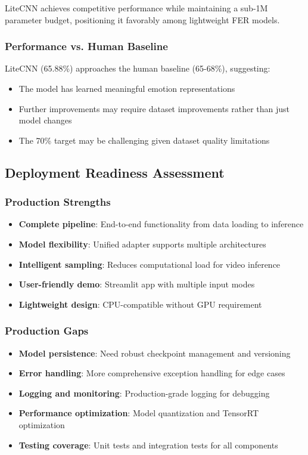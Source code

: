 \documentclass[12pt,a4paper]{article}
\begin{document}
LiteCNN achieves competitive performance while maintaining a sub-1M parameter budget, positioning it favorably among lightweight FER models.

\subsubsection{Performance vs. Human Baseline}
LiteCNN (65.88\%) approaches the human baseline (65-68\%), suggesting:
\begin{itemize}[leftmargin=*]
    \item The model has learned meaningful emotion representations
    \item Further improvements may require dataset improvements rather than just model changes
    \item The 70\% target may be challenging given dataset quality limitations
\end{itemize}

\subsection{Deployment Readiness Assessment}

\subsubsection{Production Strengths}
\begin{itemize}[leftmargin=*]
    \item \textbf{Complete pipeline}: End-to-end functionality from data loading to inference
    \item \textbf{Model flexibility}: Unified adapter supports multiple architectures
    \item \textbf{Intelligent sampling}: Reduces computational load for video inference
    \item \textbf{User-friendly demo}: Streamlit app with multiple input modes
    \item \textbf{Lightweight design}: CPU-compatible without GPU requirement
\end{itemize}

\subsubsection{Production Gaps}
\begin{itemize}[leftmargin=*]
    \item \textbf{Model persistence}: Need robust checkpoint management and versioning
    \item \textbf{Error handling}: More comprehensive exception handling for edge cases
    \item \textbf{Logging and monitoring}: Production-grade logging for debugging
    \item \textbf{Performance optimization}: Model quantization and TensorRT optimization
    \item \textbf{Testing coverage}: Unit tests and integration tests for all components
\end{itemize}
\end{document}
